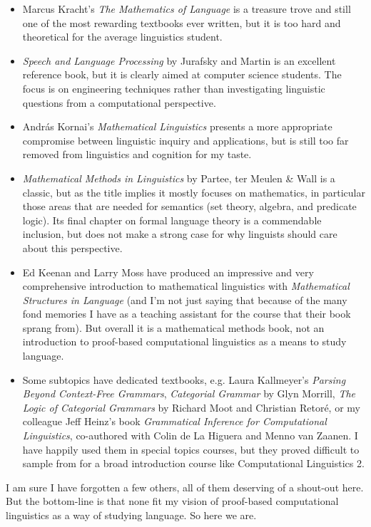 \begin{itemize}
    \item Marcus Kracht's \emph{The Mathematics of Language} is a treasure trove and still one of the most rewarding textbooks ever written, but it is too hard and theoretical for the average linguistics student.
    \item \emph{Speech and Language Processing} by Jurafsky and Martin is an excellent reference book, but it is clearly aimed at computer science students.
          The focus is on engineering techniques rather than investigating linguistic questions from a computational perspective.
    \item András Kornai's \emph{Mathematical Linguistics} presents a more appropriate compromise between linguistic inquiry and applications, but is still too far removed from linguistics and cognition for my taste.
    \item \emph{Mathematical Methods in Linguistics} by Partee, ter Meulen \& Wall is a classic, but as the title implies it mostly focuses on mathematics, in particular those areas that are needed for semantics (set theory, algebra, and predicate logic).
          Its final chapter on formal language theory is a commendable inclusion, but does not make a strong case for why linguists should care about this perspective.
    \item Ed Keenan and Larry Moss have produced an impressive and very comprehensive introduction to mathematical linguistics with \emph{Mathematical Structures in Language} (and I'm not just saying that because of the many fond memories I have as a teaching assistant for the course that their book sprang from).
          But overall it is a mathematical methods book, not an introduction to proof-based computational linguistics as a means to study language. 
    \item Some subtopics have dedicated textbooks, e.g. Laura Kallmeyer's \emph{Parsing Beyond Context-Free Grammars}, \emph{Categorial Grammar} by Glyn Morrill, \emph{The Logic of Categorial Grammars} by Richard Moot and Christian Retoré, or my colleague Jeff Heinz's book \emph{Grammatical Inference for Computational Linguistics}, co-authored with Colin de La Higuera and Menno van Zaanen.
          I have happily used them in special topics courses, but they proved difficult to sample from for a broad introduction course like Computational Linguistics 2. 
\end{itemize}

I am sure I have forgotten a few others, all of them deserving of a shout-out here.
But the bottom-line is that none fit my vision of proof-based computational linguistics as a way of studying language.
So here we are.



